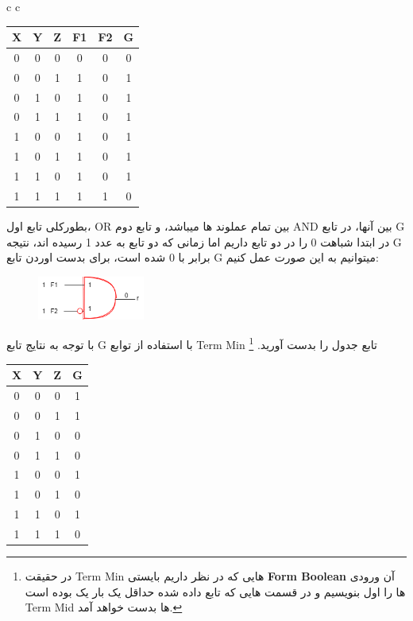 \documentclass[pt, a5paper]{article}
\begin{document}
\center
\begin{LTR}
	\begin{tabular}{ c c }
		\begin{tabular}{ c c c | c | c | c}
			X & Y & Z & F1 & F2 & G\\
			\hline
			0 & 0 & 0 &  0 &  0& 0 \\ 				
			0 & 0 & 1 &  1 &  0& 1 \\
			0 & 1 & 0 &  1 &  0& 1 \\
			0 & 1 & 1 &  1 &  0& 1 \\
			1 & 0 & 0 &  1 &  0& 1 \\
			1 & 0 & 1 &  1 &  0& 1 \\
			1 & 1 & 0 &  1 &  0& 1 \\
			1 & 1 & 1 &  1 &  1& 0 \\	
		\end{tabular}
		
	\end{tabular}
\end{LTR}
\hfill \break
\raggedleft
\justifying
بطورکلی تابع اول، OR بین تمام عملوند ها میباشد، و تابع دوم AND بین آنها، در تابع G در ابتدا شباهت 0 را در دو تابع داریم اما زمانی که دو تابع به عدد 1 رسیده اند، نتیجه G برابر با 0 شده است، برای بدست اوردن تابع G میتوانیم به این صورت عمل کنیم:\\

\begin{figure}[htbp]
	\centerline{\includegraphics[width=100pt]{img/intermediateExmp.png}}
\end{figure}
\newpage

\raggedleft
\justifying
با توجه به نتايج تابع G با استفاده از توابع Term Min تابع جدول را بدست آورید.
\footnote{
در حقیقت Term Min هایی که در نظر داریم بایستی \textbf{Form Boolean} آن ورودی ها را اول بنویسیم و در قسمت هایی که تابع داده شده حداقل یک بار یک بوده است Term Mid ها بدست خواهد آمد.}

\begin{LTR}
	\begin{tabular}{ c c c | c }		
		X & Y & Z & G \\
		\hline
		  0 & 0  & 0  &1 \\
		  0 & 0  & 1  &1 \\
		  0 & 1  & 0  &0 \\
		  0 & 1  & 1  &0 \\
		  1 & 0  & 0  &1 \\
		  1 & 0  & 1  &0 \\
		  1 & 1  & 0  &1 \\
		  1 & 1  & 1  &0 \\
	\end{tabular}
\end{LTR}
\newpage
\end{document}

